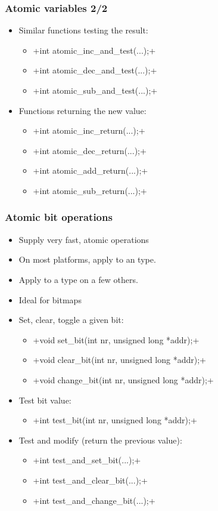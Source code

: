 \begin{frame}[fragile]
  \frametitle{Atomic variables 2/2}
  \begin{itemize}
  \item Similar functions testing the result:
    \begin{itemize}
    \item {}+int atomic_inc_and_test(...);+
    \item {}+int atomic_dec_and_test(...);+
    \item {}+int atomic_sub_and_test(...);+
    \end{itemize}
  \item Functions returning the new value:
    \begin{itemize}
    \item {}+int atomic_inc_return(...);+
    \item {}+int atomic_dec_return(...);+
    \item {}+int atomic_add_return(...);+
    \item {}+int atomic_sub_return(...);+
    \end{itemize}
  \end{itemize}
\end{frame}

\begin{frame}[fragile]
  \frametitle{Atomic bit operations}
  \begin{itemize}
  \item Supply very fast, atomic operations
  \item On most platforms, apply to an  type.
  \item Apply to a  type on a few others.
  \item Ideal for bitmaps
  \item Set, clear, toggle a given bit:
    \begin{itemize}
    \item {}+void set_bit(int nr, unsigned long *addr);+
    \item {}+void clear_bit(int nr, unsigned long *addr);+
    \item {}+void change_bit(int nr, unsigned long *addr);+
    \end{itemize}
  \item Test bit value:
    \begin{itemize}
    \item {}+int test_bit(int nr, unsigned long *addr);+
    \end{itemize}
  \item Test and modify (return the previous value):
    \begin{itemize}
    \item {}+int test_and_set_bit(...);+
    \item {}+int test_and_clear_bit(...);+
    \item {}+int test_and_change_bit(...);+
    \end{itemize}
  \end{itemize}
\end{frame}

